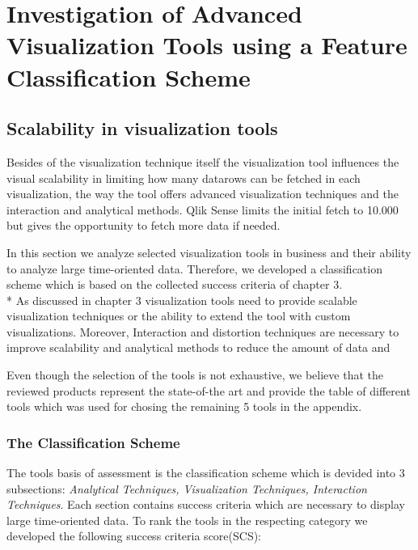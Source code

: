 \chapter{Investigation of Advanced Visualization Tools using a Feature Classification Scheme}
\label{chap:Tools}
\section{Scalability in visualization tools}
Besides of the visualization technique itself the visualization tool influences the visual scalability in limiting how many datarows can be fetched in each visualization, the way the tool offers advanced visualization techniques and the interaction and analytical methods. Qlik Sense limits the initial fetch to 10.000 but gives the opportunity to fetch more data if needed. 

In this section we analyze selected visualization tools in business and their ability to analyze large time-oriented data. Therefore, we developed a classification scheme which is based on the collected success criteria of chapter 3. \\*
As discussed in chapter 3 visualization tools need to provide scalable visualization techniques or the ability to extend the tool with custom visualizations. Moreover, Interaction and distortion techniques are necessary to improve scalability and analytical methods to reduce the amount of data and 


Even though the selection of the tools is not exhaustive, we believe that the reviewed products represent the state-of-the art and provide the table of different tools which was used for chosing the remaining 5 tools in the appendix.
\subsection{The Classification Scheme}
The tools basis of assessment is the classification scheme which is devided into 3  subsections: \textit{Analytical Techniques, Visualization Techniques, Interaction Techniques}. 
Each section contains success criteria which are necessary to display large time-oriented data. To rank the tools in the respecting category we developed the following success criteria score(SCS):

